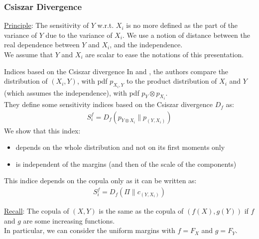 \documentclass[8pt]{beamer}
\begin{document}
\begin{frame}
 \frametitle{Csiszar Divergence}
\small
\underline{Principle}: The sensitivity of $Y$ w.r.t. $X_i$ is no more defined as the part of the variance of $Y$ due to the variance of $X_i$. We use a notion of distance between the real dependence between $Y$ and $X_i$, and the independence.\\
We assume that $Y$ and $X_i$ are scalar to ease the notations of this presentation.

\begin{block}{Indices based on the Csiszar divergence}
 In \cite{Borgonovo2016} and \cite{DaVeiga2013} , the authors compare the distribution of  $(X_i,Y)$, with pdf $p_{X_i,Y}$ to the product distribution of $X_i$ and $Y$ (which assumes the independence), with pdf $p_{Y}\otimes p_{X_i}$. \\
 They define some sensitivity indices based on the  \alert{Csiszar divergence $D_f$} as:
    \begin{align*}
      S_i^f= D_f(p_{Y \otimes X_i} \| p_{(Y,X_i)})
    \end{align*}
 We show that this index: 
 \begin{itemize}
  \item depends on the whole distribution and not on its first moments only
  \item is independent of the margins (and then of the scale of the components)
 \end{itemize}
This indice  depends on the copula only as it can be written as:
    \alert{\begin{align*}
      S_i^f= D_f(\Pi \| c_{(Y,X_i)})
    \end{align*}}

\end{block}

\underline{Recall}: The copula of $(X,Y)$ is the same as the copula of $(f(X), g(Y))$ if $f$ and $g$ are some increasing functions.\\
In particular, we can consider the uniform margins with  $f = F_X$ and $g = F_Y$.
\end{frame}



\end{document}
